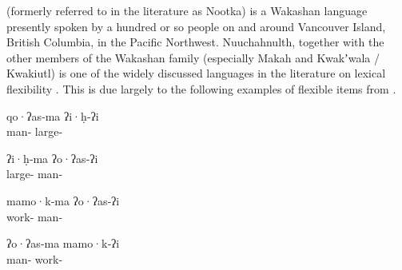  (formerly referred to in the literature as Nootka) is a Wakashan language presently spoken by a hundred or so people on and around Vancouver Island, British Columbia, in the Pacific Northwest. Nuuchahnulth, together with the other members of the Wakashan family (especially Makah and Kwakʼwala / Kwakiutl) is one of the widely discussed languages in the literature on lexical flexibility \parencites{Swadesh1939b}{Jacobsen1979}{Braithwaite2015}. This is due largely to the following examples of flexible items from \textcite{Swadesh1939b}.

\begin{exe}

  \ex\label{ex:1.8}
  \begin{xlist}

    \ex
    \gll qo·ʔas‑ma        ʔi·ḥ‑ʔi\\
         man‑ large‑\\

    \ex
    \gll ʔi·ḥ‑ma            ʔo·ʔas‑ʔi\\
         large‑ man‑\\

  \end{xlist}

  \ex\label{ex:1.9}
  \begin{xlist}

    \ex
    \gll mamo·k‑ma         ʔo·ʔas‑ʔi\\
         work‑ man‑\\

    \ex
    \gll ʔo·ʔas‑ma        mamo·k‑ʔi\\
         man‑ work‑\\

  \end{xlist}

\end{exe}

